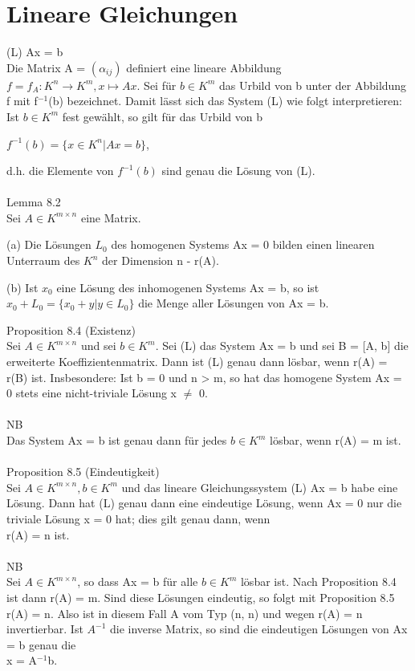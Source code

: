 \section{Lineare Gleichungen}
(L)  Ax = b\\
Die Matrix A = $(\alpha_{ij})$ definiert eine lineare Abbildung $f = f_A: K^n \to K^m, x \mapsto Ax$. Sei für $b \in K^m$ das Urbild von b unter der Abbildung f mit f$^{-1}$(b) bezeichnet. Damit lässt sich das System (L) wie folgt interpretieren: Ist $b \in K^m$ fest gewählt, so gilt für das Urbild von b
\begin{center}
$f^{-1}(b) = \{x \in K^n | Ax = b\}$,
\end{center}
d.h. die Elemente von $f^{-1}(b)$ sind genau die Lösung von (L).\\ 
\\
Lemma 8.2\\
Sei $A \in K^{m \times n}$ eine Matrix.
\begin{compactenum}
\item[(a)] Die Lösungen $L_0$ des homogenen Systems Ax = 0 bilden einen linearen Unterraum des $K^n$ der Dimension n - r(A).
\item[(b)] Ist $x_0$ eine Lösung des inhomogenen Systems Ax = b, so ist $x_0 + L_0 = \{x_0 +y | y \in L_0\}$ die Menge aller Lösungen von Ax = b.\\
\end{compactenum}
Proposition 8.4 (Existenz)\\
Sei $A \in K^{m \times n}$ und sei $b \in K^m$. Sei (L) das System Ax = b und sei B = [A, b] die erweiterte Koeffizientenmatrix. Dann ist (L) genau dann lösbar, wenn r(A) = r(B) ist. Insbesondere: Ist b = 0 und n > m, so hat das homogene System Ax = 0 stets eine nicht-triviale Lösung x $\neq$ 0.\\
\\
NB\\
Das System Ax = b ist genau dann für jedes $b \in K^m$ lösbar, wenn r(A) = m ist.\\
\\
Proposition 8.5 (Eindeutigkeit)\\
Sei $A \in K^{m \times n},b \in K^m$ und das lineare Gleichungssystem (L) Ax = b habe eine Lösung. Dann hat (L) genau dann eine eindeutige Lösung, wenn Ax = 0 nur die triviale Lösung x = 0 hat; dies gilt genau dann, wenn \\r(A) = n ist.\\
\\
NB\\
Sei $A \in K^{m \times n}$, so dass Ax = b für alle $b \in K^m$ lösbar ist. Nach Proposition 8.4 ist dann r(A) = m. Sind diese Lösungen eindeutig, so folgt mit Proposition 8.5 r(A) = n. Also ist in diesem Fall A vom Typ (n, n) und wegen r(A) = n invertierbar. Ist $A^{-1}$ die inverse Matrix, so sind die eindeutigen Lösungen von Ax = b genau die \\x = A$^{-1}$b.\\
